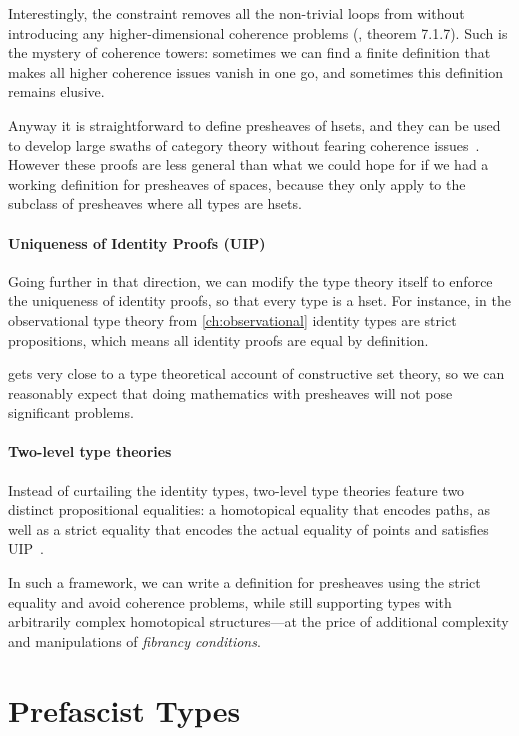 Interestingly, the  constraint removes all the non-trivial 
loops from  without introducing any higher-dimensional coherence 
problems (, theorem 7.1.7). 
% 
Such is the mystery of coherence towers: sometimes we can find a finite 
definition that makes all higher coherence issues vanish in one go, and 
sometimes this definition remains elusive.

Anyway it is straightforward to define presheaves of hsets, and they can be used 
to develop large swaths of category theory without fearing coherence 
issues~. 
However these proofs are less general than what we could hope for if we had a 
working definition for presheaves of spaces, because they only apply to
the subclass of presheaves where all types are hsets.

\paragraph{Uniqueness of Identity Proofs (UIP)}
% 
Going further in that direction, we can modify the type theory itself to 
enforce the uniqueness of identity proofs, so that every type is a hset.
% 
For instance, in the observational type theory \SetoidCC from 
\cref{ch:observational} identity types are strict propositions,
which means all identity proofs are equal by definition.

\SetoidCC gets very close to a type theoretical account of constructive set 
theory, so we can reasonably expect that doing mathematics with presheaves 
will not pose significant problems.

\paragraph{Two-level type theories}
% 
Instead of curtailing the identity types, two-level type theories 
feature two distinct propositional equalities: a homotopical equality that 
encodes paths, as well as a strict equality that encodes the actual equality
of points and satisfies UIP~.

In such a framework, we can write a definition for presheaves using the strict equality
and avoid coherence problems, while still supporting types with arbitrarily
complex homotopical structures---at the price of additional complexity
and manipulations of \emph{fibrancy conditions}.

\section{Prefascist Types}
\label{sec:prefascist}

